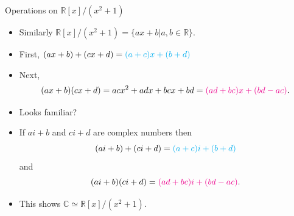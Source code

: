 \documentclass[ %
usenames,dvipsnames,
aspectratio=169,11pt]{beamer}
\newenvironment{stepitemize}{\begin{itemize}[<+->]}{\end{itemize} }
\newcommand{\R}{\mathbb{R}}
\newcommand{\C}{\mathbb{C}}
\begin{document}
\begin{frame}{Operations on $\R[x]/(x^2+1)$}
    \begin{stepitemize}
\item Similarly $\R[x]/(x^2+1) = \{ax+b| a,b\in \R\}$.
\item First, $(ax+b)+(cx+d)={\color{cyan}(a+c)x+(b+d)}$
    \item Next,
    $$(ax+b)(cx+d) = acx^2+adx+bcx+bd = {\color{magenta}(ad+bc)x+(bd-ac)}.$$
    \item Looks familiar?
    \item If $ai+b$ and $ci+d$ are complex numbers then
    $$(ai+b)+(ci+d) = {\color{cyan}(a+c)i+(b+d)}$$
    and
   $$ (ai+b)(ci+d) = {\color{magenta}(ad+bc)i+(bd-ac)}.$$
\item This shows $\C \simeq \R[x]/(x^2+1)$.
    \end{stepitemize}
\end{frame}
\end{document}
